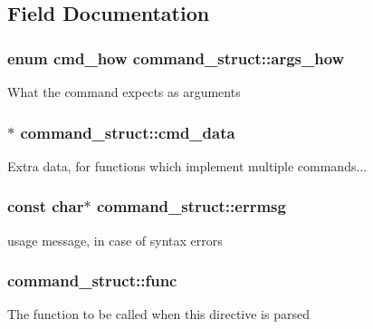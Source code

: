 \subsection{Field Documentation}
\subsubsection[{\texorpdfstring{args\+\_\+how}{args_how}}]{\setlength{\rightskip}{0pt plus 5cm}enum {\bf cmd\+\_\+how} command\+\_\+struct\+::args\+\_\+how}\hypertarget{structcommand__struct_a7ef43a10549eb3012637c776a42eb7a7}{}\label{structcommand__struct_a7ef43a10549eb3012637c776a42eb7a7}
What the command expects as arguments 
\subsubsection[{\texorpdfstring{cmd\+\_\+data}{cmd_data}}]{$\ast$ command\+\_\+struct\+::cmd\+\_\+data}\hypertarget{structcommand__struct_a62f7f7a0709cb58e9a0369739d4481ac}{}\label{structcommand__struct_a62f7f7a0709cb58e9a0369739d4481ac}
Extra data, for functions which implement multiple commands... 
\subsubsection[{\texorpdfstring{errmsg}{errmsg}}]{\setlength{\rightskip}{0pt plus 5cm}const char$\ast$ command\+\_\+struct\+::errmsg}\hypertarget{structcommand__struct_a014f65b75698bbe337db0a5c3cf330d0}{}\label{structcommand__struct_a014f65b75698bbe337db0a5c3cf330d0}
\textquotesingle{}usage\textquotesingle{} message, in case of syntax errors 
\subsubsection[{\texorpdfstring{func}{func}}]{ command\+\_\+struct\+::func}\hypertarget{structcommand__struct_aa00d440ddb85b0179109e00c421628e6}{}\label{structcommand__struct_aa00d440ddb85b0179109e00c421628e6}
The function to be called when this directive is parsed 
